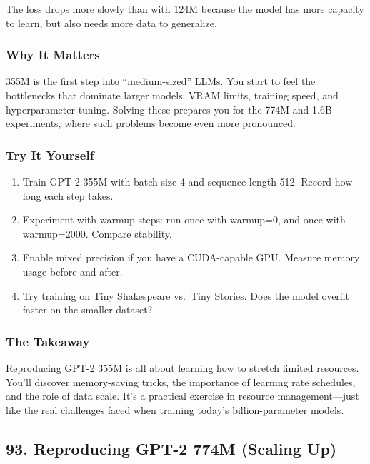 \documentclass[
  letterpaper,
  DIV=11,
  numbers=noendperiod]{scrreprt}
\providecommand{\tightlist}{%
  \setlength{\itemsep}{0pt}\setlength{\parskip}{0pt}}
\begin{document}
The loss drops more slowly than with 124M because the model has more
capacity to learn, but also needs more data to generalize.

\subsubsection{Why It Matters}\label{why-it-matters-66}

355M is the first step into ``medium-sized'' LLMs. You start to feel the
bottlenecks that dominate larger models: VRAM limits, training speed,
and hyperparameter tuning. Solving these prepares you for the 774M and
1.6B experiments, where such problems become even more pronounced.

\subsubsection{Try It Yourself}\label{try-it-yourself-80}

\begin{enumerate}
\def\labelenumi{\arabic{enumi}.}
\tightlist
\item
  Train GPT-2 355M with batch size 4 and sequence length 512. Record how
  long each step takes.
\item
  Experiment with warmup steps: run once with warmup=0, and once with
  warmup=2000. Compare stability.
\item
  Enable mixed precision if you have a CUDA-capable GPU. Measure memory
  usage before and after.
\item
  Try training on Tiny Shakespeare vs.~Tiny Stories. Does the model
  overfit faster on the smaller dataset?
\end{enumerate}

\subsubsection{The Takeaway}\label{the-takeaway-81}

Reproducing GPT-2 355M is all about learning how to stretch limited
resources. You'll discover memory-saving tricks, the importance of
learning rate schedules, and the role of data scale. It's a practical
exercise in resource management---just like the real challenges faced
when training today's billion-parameter models.

\subsection{93. Reproducing GPT-2 774M (Scaling
Up)}\label{reproducing-gpt-2-774m-scaling-up}
\end{document}
